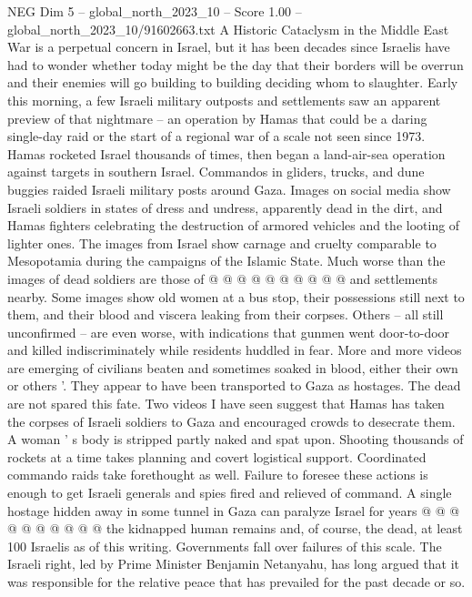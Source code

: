 \begin{textsample}{NEG Dim 5 – global\_north\_2023\_10 – Score 1.00 – global\_north\_2023\_10/91602663.txt}  \label{ex:f5_neg_024}
A Historic Cataclysm in the Middle East War is a perpetual concern in Israel, but it has been decades since Israelis have had to wonder whether today might be the day that their borders will be overrun and their enemies will go building to building deciding whom to slaughter.
Early this morning, a few Israeli military outposts and settlements saw an apparent preview of that nightmare -- an operation by Hamas that could be a daring single-day raid or the start of a regional war of a scale not seen since 1973.
Hamas rocketed Israel thousands of times, then began a land-air-sea operation against targets in southern Israel.
Commandos in gliders, trucks, and dune buggies raided Israeli military posts around Gaza.
Images on social media show Israeli soldiers in states of dress and undress, apparently dead in the dirt, and Hamas fighters celebrating the destruction of armored vehicles and the looting of lighter ones.
The images from Israel show carnage and cruelty comparable to Mesopotamia during the campaigns of the Islamic State.
Much worse than the images of dead soldiers are those of @ @ @ @ @ @ @ @ @ @ and settlements nearby.
Some images show old women at a bus stop, their possessions still next to them, and their blood and viscera leaking from their corpses.
Others -- all still unconfirmed -- are even worse, with indications that gunmen went door-to-door and killed indiscriminately while residents huddled in fear.
More and more videos are emerging of civilians beaten and sometimes soaked in blood, either their own or others '.
They appear to have been transported to Gaza as hostages.
The dead are not spared this fate.
Two videos I have seen suggest that Hamas has taken the corpses of Israeli soldiers to Gaza and encouraged crowds to desecrate them.
A woman ' s body is stripped partly naked and spat upon.
Shooting thousands of rockets at a time takes planning and covert logistical support.
Coordinated commando raids take forethought as well.
Failure to foresee these actions is enough to get Israeli generals and spies fired and relieved of command.
A single hostage hidden away in some tunnel in Gaza can paralyze Israel for years @ @ @ @ @ @ @ @ @ @ the kidnapped human remains and, of course, the dead, at least 100 Israelis as of this writing.
Governments fall over failures of this scale.
The Israeli right, led by Prime Minister Benjamin Netanyahu, has long argued that it was responsible for the relative peace that has prevailed for the past decade or so.

\end{textsample}

